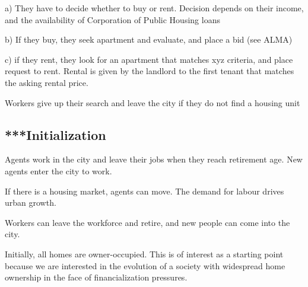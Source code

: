         a) They have to decide whether to buy or rent. Decision depends on their income, and the availability of Corporation of Public Housing loans 


        b) If they buy, they seek apartment and evaluate, and place a bid (see ALMA)
        
        c) if they rent, they look for an apartment that matches xyz criteria, and place request to rent. Rental is given by the landlord to the first tenant that matches the asking rental price. 


Workers give up their search and leave the city if they do not find a housing unit 

%


\subsection{***Initialization}

Agents work in the city and leave their jobs when they reach retirement age.
New agents enter the city to work.

 
 If there is a housing market, agents can move. %
The demand for labour drives urban growth. %


Workers can leave the workforce and retire, and new people can come into the city. 

Initially, all homes are owner-occupied. This is of interest as a starting point because we are interested in the evolution of a society with widespread home ownership in the face of financialization pressures. 

